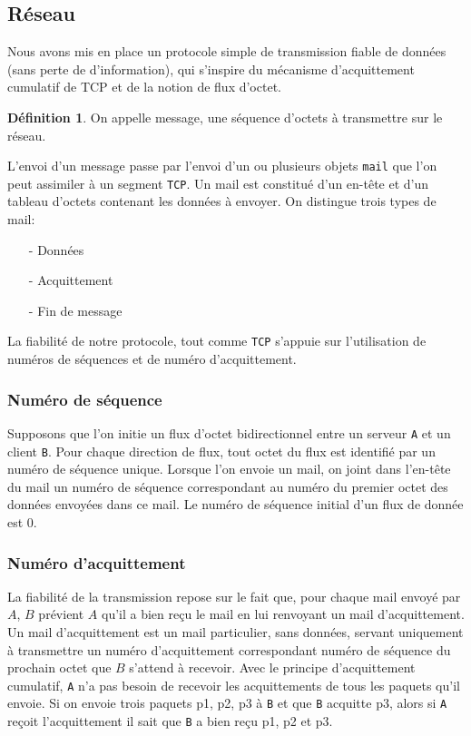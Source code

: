 \documentclass[11pt]{article}
\theoremstyle{definition}
\theoremstyle{definition}
\newtheorem*{myDef}{Définition}
\begin{document}
\subsection{Réseau}
Nous avons mis en place un protocole simple de transmission fiable de données (sans perte de d'information), qui s'inspire du mécanisme d'acquittement cumulatif de TCP et de la notion de flux d'octet.
\begin{myDef}
  On appelle message, une séquence d'octets à transmettre sur le réseau.
\end{myDef}
L'envoi d'un message passe par l'envoi d'un ou plusieurs objets \texttt{mail} que l'on peut assimiler à un segment \texttt{TCP}. 
Un mail est constitué d'un en-tête et d'un tableau d'octets contenant les données à envoyer.
On distingue trois types de mail:
\begin{itemize}
\item[-]Données
\item[-]Acquittement
\item[-]Fin de message
\end{itemize}
La fiabilité de notre protocole, tout comme \texttt{TCP} s'appuie sur l'utilisation de numéros de séquences et de numéro d'acquittement.

\subsubsection{Numéro de séquence}
Supposons que l'on initie un flux d'octet bidirectionnel entre un serveur \texttt{A} et un client \texttt{B}.
Pour chaque direction de flux, tout octet du flux est identifié par un numéro de séquence unique. 
Lorsque l'on envoie un mail, on joint dans l'en-tête du mail un numéro de séquence correspondant
au numéro du premier octet des données envoyées dans ce mail. Le numéro de séquence initial d'un flux de donnée est $0$.

\subsubsection{Numéro d'acquittement}
La fiabilité de la transmission repose sur le fait que, pour chaque mail envoyé par $A$, $B$ prévient $A$ qu'il a bien reçu le mail en lui renvoyant un mail d'acquittement.
Un mail d'acquittement est un mail particulier, sans données, servant uniquement à transmettre un numéro d'acquittement correspondant numéro de séquence du prochain octet que $B$ s'attend à recevoir.
Avec le principe d'acquittement cumulatif, \texttt{A} n'a pas besoin de recevoir les acquittements de tous les paquets qu'il envoie. Si on envoie trois paquets p1, p2, p3 à \texttt{B} et que \texttt{B}
acquitte p3, alors si \texttt{A} reçoit l'acquittement il sait que \texttt{B} a bien reçu p1, p2 et p3.
\end{document}
